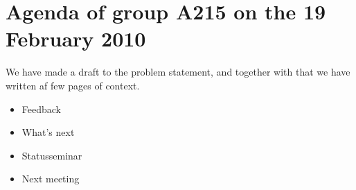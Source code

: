 \documentclass{report}
\begin{document}
\section*{Agenda of group A215 on the 19 February 2010}
We have made a draft to the problem statement, and together with that we have written af few pages of context.
\begin{itemize}
	\item Feedback
	\item What's next
	\item Statusseminar
	\item Next meeting
\end{itemize}
\end{document}
